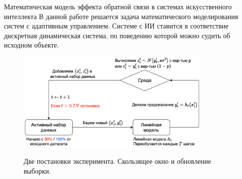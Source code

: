 \documentclass{beamer}
\begin{document}
\begin{frame}{Математическая модель эффекта обратной связи в системах искусственного интеллекта}
    \vspace{-2mm}
    В данной работе решается задача математического моделирования систем с адаптивным управлением. Системе с ИИ ставится в соответствие дискретная динамическая система, по поведению которой можно судить об исходном объекте.
    \vspace{-1mm}
    \begin{figure}
        \centering
        \includegraphics[width=0.85\textwidth]{fig/Experiment_setups.png}
        
        Две постановки эксперимента. \color{red}Скользящее окно \color{black}и \color{blue}обновление выборки.
        \label{exp}
    \end{figure}

\end{frame}
\end{document}
